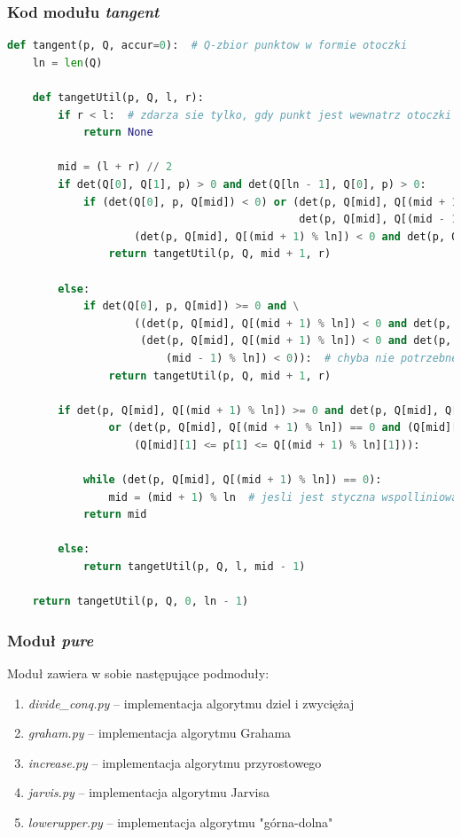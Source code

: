 \documentclass[11pt]{article}
\theoremstyle{remark} \newtheorem{definition}{def.}
\theoremstyle{definition} \newtheorem{twierdzenie}{tw.}
\begin{document}
\subsubsection*{Kod modułu \emph{tangent}}
\begin{lstlisting}[language=Python]
def tangent(p, Q, accur=0):  # Q-zbior punktow w formie otoczki
    ln = len(Q)

    def tangetUtil(p, Q, l, r):
        if r < l:  # zdarza sie tylko, gdy punkt jest wewnatrz otoczki
            return None

        mid = (l + r) // 2
        if det(Q[0], Q[1], p) > 0 and det(Q[ln - 1], Q[0], p) > 0:
            if (det(Q[0], p, Q[mid]) < 0) or (det(p, Q[mid], Q[(mid + 1) % ln]) < 0 and \
                                              det(p, Q[mid], Q[(mid - 1) % ln]) < 0) or \
                    (det(p, Q[mid], Q[(mid + 1) % ln]) < 0 and det(p, Q[mid], Q[(mid - 1) % ln]) >= 0):
                return tangetUtil(p, Q, mid + 1, r)

        else:
            if det(Q[0], p, Q[mid]) >= 0 and \
                    ((det(p, Q[mid], Q[(mid + 1) % ln]) < 0 and det(p, Q[mid], Q[(mid - 1) % ln]) >= 0) or \
                     (det(p, Q[mid], Q[(mid + 1) % ln]) < 0 and det(p, Q[mid], Q[
                         (mid - 1) % ln]) < 0)):  # chyba nie potrzebne sprawdz na koncu
                return tangetUtil(p, Q, mid + 1, r)

        if det(p, Q[mid], Q[(mid + 1) % ln]) >= 0 and det(p, Q[mid], Q[(mid - 1) % ln]) >= 0 \
                or (det(p, Q[mid], Q[(mid + 1) % ln]) == 0 and (Q[mid][0] <= p[0] <= Q[(mid + 1) % ln][0]) and \
                    (Q[mid][1] <= p[1] <= Q[(mid + 1) % ln][1])):

            while (det(p, Q[mid], Q[(mid + 1) % ln]) == 0):
                mid = (mid + 1) % ln  # jesli jest styczna wspolliniowa, to bierzmy pod uwage punkt blizszy
            return mid

        else:
            return tangetUtil(p, Q, l, mid - 1)

    return tangetUtil(p, Q, 0, ln - 1)
\end{lstlisting}

\subsubsection{Moduł \emph{pure}}

Moduł zawiera w sobie następujące podmoduły:

\begin{enumerate}
    \item   \emph{divide\_conq.py} -- implementacja algorytmu dziel i zwyciężaj
    \item   \emph{graham.py} -- implementacja algorytmu Grahama
    \item   \emph{increase.py} -- implementacja algorytmu przyrostowego
    \item   \emph{jarvis.py} -- implementacja algorytmu Jarvisa
    \item   \emph{lowerupper.py} -- implementacja algorytmu "górna-dolna"
\end{enumerate}
\end{document}
